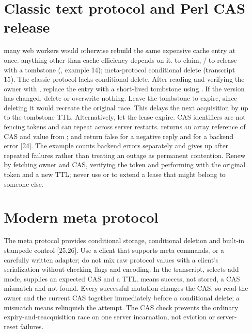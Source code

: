 \section{Classic text protocol and Perl CAS release}
{many web workers would otherwise rebuild the same expensive cache entry at once.}
{anything other than cache efficiency depends on it.}
{ to claim, / to release with a tombstone (, example 14); meta-protocol conditional delete (transcript 15).}
The classic protocol lacks conditional delete. After reading and verifying the owner with , replace the entry with a short-lived tombstone using . If the version has changed, delete or overwrite nothing. Leave the tombstone to expire, since deleting it would recreate the original race. This delays the next acquisition by up to the tombstone TTL. Alternatively, let the lease expire. CAS identifiers are not fencing tokens and can repeat across server restarts.
 returns an array reference of CAS and value from ;  and  return false for a negative reply and  for a backend error [24]. The example counts backend errors separately and gives up after repeated failures rather than treating an outage as permanent contention. Renew by fetching owner and CAS, verifying the token and performing  with the original token and a new TTL; never use  or  to extend a lease that might belong to someone else.

\section{Modern meta protocol}
The meta protocol provides conditional storage, conditional deletion and built-in stampede control [25,26]. Use a client that supports meta commands, or a carefully written adapter; do not mix raw protocol values with a client's serialization without checking flags and encoding. In the transcript,  selects add mode,  supplies an expected CAS and  a TTL.  means success,  not stored,  a CAS mismatch and  not found.
Every successful mutation changes the CAS, so read the owner and the current CAS together immediately before a conditional delete; a mismatch means relinquish the attempt. The CAS check prevents the ordinary expiry-and-reacquisition race on one server incarnation, not eviction or server-reset failures.

